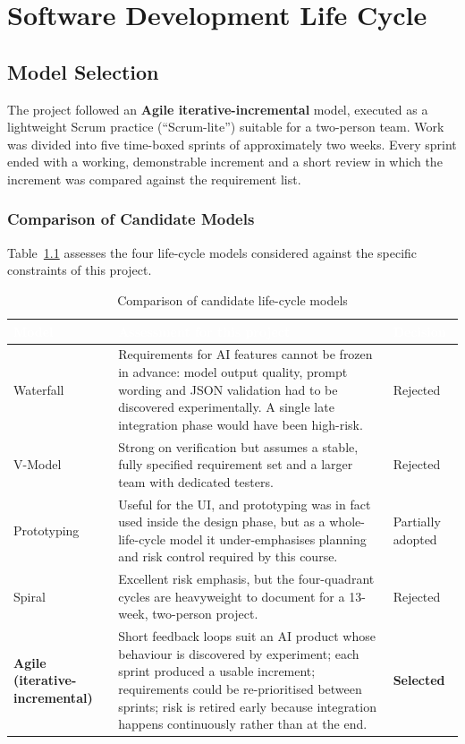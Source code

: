 \documentclass[12pt,a4paper,oneside]{report}
\begin{document}
\chapter{Software Development Life Cycle}\label{ch:sdlc}

\section{Model Selection}

The project followed an \textbf{Agile iterative-incremental} model, executed as a
lightweight Scrum practice (``Scrum-lite'') suitable for a two-person team. Work was
divided into five time-boxed sprints of approximately two weeks. Every sprint ended
with a working, demonstrable increment and a short review in which the increment was
compared against the requirement list.

\subsection{Comparison of Candidate Models}

Table~\ref{tab:sdlccompare} assesses the four life-cycle models considered against the specific constraints of this project.

\begin{table}[H]
\centering
\caption{Comparison of candidate life-cycle models}
\label{tab:sdlccompare}
\small
\begin{tabularx}{\textwidth}{@{}p{2.5cm}Xp{2.1cm}@{}}
\toprule
\rowcolor{tblhead} \textcolor{white}{\textbf{Model}} &
\textcolor{white}{\textbf{Assessment for this project}} &
\textcolor{white}{\textbf{Decision}} \\
\midrule
Waterfall & Requirements for AI features cannot be frozen in advance: model output
   quality, prompt wording and JSON validation had to be discovered experimentally.
   A single late integration phase would have been high-risk. & Rejected \\
V-Model & Strong on verification but assumes a stable, fully specified requirement
   set and a larger team with dedicated testers. & Rejected \\
Prototyping & Useful for the UI, and prototyping was in fact used inside the design
   phase, but as a whole-life-cycle model it under-emphasises planning and risk
   control required by this course. & Partially adopted \\
Spiral & Excellent risk emphasis, but the four-quadrant cycles are heavyweight to
   document for a 13-week, two-person project. & Rejected \\
\textbf{Agile (iterative-incremental)} & Short feedback loops suit an AI product whose
   behaviour is discovered by experiment; each sprint produced a usable increment;
   requirements could be re-prioritised between sprints; risk is retired early
   because integration happens continuously rather than at the end. & \textbf{Selected} \\
\bottomrule
\end{tabularx}
\end{table}
\end{document}
